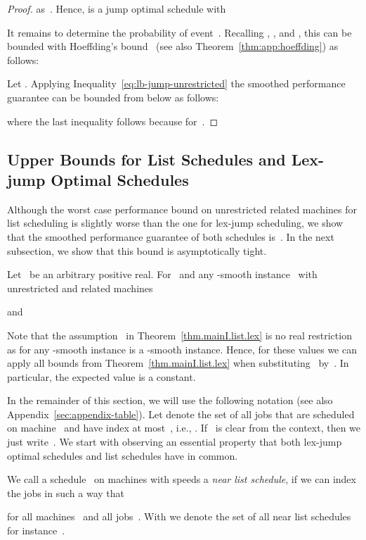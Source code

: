 \documentclass[a4paper,11pt,fleqn]{article}
\begin{document}
\begin{proof}
as~. Hence,  is a jump optimal schedule with 

It remains to determine the probability of event~. Recalling , , and , this can be bounded with Hoeffding's bound~\cite{Hoeffding:1963} (see also Theorem~\ref{thm:app:hoeffding}) as follows:

Let . Applying Inequality~\eqref{eq:lb-jump-unrestricted} the smoothed performance guarantee can be bounded from below as follows: 

where the last inequality follows because  for~.
\end{proof}

\subsection{Upper Bounds for List Schedules and Lex-jump Optimal Schedules}
\label{subsec:ub-list-lex-jump}


Although the worst case performance bound on unrestricted related machines for list scheduling is slightly worse than the one for lex-jump scheduling, we show that the smoothed performance guarantee of both schedules is~. In the next subsection, we show that this bound is asymptotically tight.

\begin{theorem}
\label{thm.mainI.list.lex}
Let~ be an arbitrary positive real. For~ and any -smooth instance~ with unrestricted and related machines

and

\end{theorem}

Note that the assumption~ in
Theorem~\ref{thm.mainI.list.lex} is no real restriction as for  any -smooth instance is a -smooth instance. Hence,
for these values we can apply all bounds from
Theorem~\ref{thm.mainI.list.lex} when substituting~ by~. In
particular, the expected value is a constant.

In the remainder of this section, we will use the following notation (see also Appendix~\ref{sec:appendix-table}).
Let  denote the set
of all jobs that are scheduled on machine~ and have index at most~, i.e.,
. If~ is clear
from the context, then we just write~.
We start with observing an essential property that both lex-jump optimal
schedules and list schedules have in common.

\begin{definition}
We call a schedule~ on machines  with speeds  a \emph{near list schedule}, if we can index the jobs in
such a way that

for all machines~ and all jobs~. With  we denote the set of all near list schedules for instance~.
\end{definition}
\end{document}
